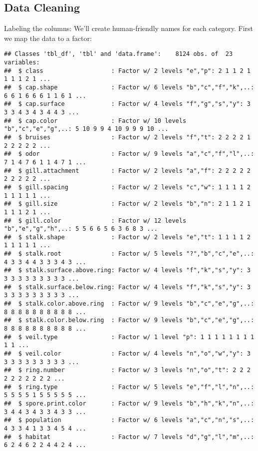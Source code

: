 \documentclass[]{article}
\newenvironment{Shaded}{\begin{snugshade}}{\end{snugshade}}
\newcommand{\KeywordTok}[1]{\textcolor[rgb]{0.13,0.29,0.53}{\textbf{#1}}}
\newcommand{\StringTok}[1]{\textcolor[rgb]{0.31,0.60,0.02}{#1}}
\newcommand{\ControlFlowTok}[1]{\textcolor[rgb]{0.13,0.29,0.53}{\textbf{#1}}}
\newcommand{\OperatorTok}[1]{\textcolor[rgb]{0.81,0.36,0.00}{\textbf{#1}}}
\newcommand{\NormalTok}[1]{#1}
\begin{document}
\subsection{Data Cleaning}\label{data-cleaning}

Labeling the columns: We'll create human-friendly names for each
category. First we map the data to a factor:

\begin{Shaded}
\end{Shaded}

\begin{verbatim}
## Classes 'tbl_df', 'tbl' and 'data.frame':    8124 obs. of  23 variables:
##  $ class                   : Factor w/ 2 levels "e","p": 2 1 1 2 1 1 1 1 2 1 ...
##  $ cap.shape               : Factor w/ 6 levels "b","c","f","k",..: 6 6 1 6 6 6 1 1 6 1 ...
##  $ cap.surface             : Factor w/ 4 levels "f","g","s","y": 3 3 3 4 3 4 3 4 4 3 ...
##  $ cap.color               : Factor w/ 10 levels "b","c","e","g",..: 5 10 9 9 4 10 9 9 9 10 ...
##  $ bruises                 : Factor w/ 2 levels "f","t": 2 2 2 2 1 2 2 2 2 2 ...
##  $ odor                    : Factor w/ 9 levels "a","c","f","l",..: 7 1 4 7 6 1 1 4 7 1 ...
##  $ gill.attachment         : Factor w/ 2 levels "a","f": 2 2 2 2 2 2 2 2 2 2 ...
##  $ gill.spacing            : Factor w/ 2 levels "c","w": 1 1 1 1 2 1 1 1 1 1 ...
##  $ gill.size               : Factor w/ 2 levels "b","n": 2 1 1 2 1 1 1 1 2 1 ...
##  $ gill.color              : Factor w/ 12 levels "b","e","g","h",..: 5 5 6 6 5 6 3 6 8 3 ...
##  $ stalk.shape             : Factor w/ 2 levels "e","t": 1 1 1 1 2 1 1 1 1 1 ...
##  $ stalk.root              : Factor w/ 5 levels "?","b","c","e",..: 4 3 3 4 4 3 3 3 4 3 ...
##  $ stalk.surface.above.ring: Factor w/ 4 levels "f","k","s","y": 3 3 3 3 3 3 3 3 3 3 ...
##  $ stalk.surface.below.ring: Factor w/ 4 levels "f","k","s","y": 3 3 3 3 3 3 3 3 3 3 ...
##  $ stalk.color.above.ring  : Factor w/ 9 levels "b","c","e","g",..: 8 8 8 8 8 8 8 8 8 8 ...
##  $ stalk.color.below.ring  : Factor w/ 9 levels "b","c","e","g",..: 8 8 8 8 8 8 8 8 8 8 ...
##  $ veil.type               : Factor w/ 1 level "p": 1 1 1 1 1 1 1 1 1 1 ...
##  $ veil.color              : Factor w/ 4 levels "n","o","w","y": 3 3 3 3 3 3 3 3 3 3 ...
##  $ ring.number             : Factor w/ 3 levels "n","o","t": 2 2 2 2 2 2 2 2 2 2 ...
##  $ ring.type               : Factor w/ 5 levels "e","f","l","n",..: 5 5 5 5 1 5 5 5 5 5 ...
##  $ spore.print.color       : Factor w/ 9 levels "b","h","k","n",..: 3 4 4 3 4 3 3 4 3 3 ...
##  $ population              : Factor w/ 6 levels "a","c","n","s",..: 4 3 3 4 1 3 3 4 5 4 ...
##  $ habitat                 : Factor w/ 7 levels "d","g","l","m",..: 6 2 4 6 2 2 4 4 2 4 ...
\end{verbatim}
\end{document}
